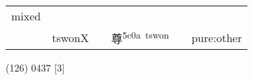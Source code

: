 \documentclass[14pt,a4paper]{scrartcl}
\begin{document}
\begin{longtable}[c]{@{}llllll@{}}
\begin{minipage}[t]{0.14\columnwidth}\raggedright\strut
mixed
\strut\end{minipage}\tabularnewline
\begin{minipage}[t]{0.14\columnwidth}\raggedright\strut
𢍜
\strut\end{minipage} &
\begin{minipage}[t]{0.14\columnwidth}\raggedright\strut
tswonX
\strut\end{minipage} &
\begin{minipage}[t]{0.14\columnwidth}\raggedright\strut
\strut\end{minipage} &
\begin{minipage}[t]{0.14\columnwidth}\raggedright\strut
尊\textsuperscript{5c0a~tswon}
\strut\end{minipage} &
\begin{minipage}[t]{0.14\columnwidth}\raggedright\strut
\strut\end{minipage} &
\begin{minipage}[t]{0.14\columnwidth}\raggedright\strut
pure:other
\strut\end{minipage}\tabularnewline
\bottomrule
\end{longtable}

(126) 0437 {[}3{]}
\end{document}
